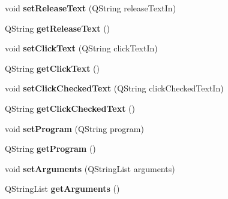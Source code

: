 \begin{DoxyCompactItemize}
\item 
\hypertarget{classQEGenericButton_a64a200354d9204778b75afdfb0e85f84}{
void {\bfseries setReleaseText} (QString releaseTextIn)}
\label{classQEGenericButton_a64a200354d9204778b75afdfb0e85f84}

\item 
\hypertarget{classQEGenericButton_a6322b1cb4ab8b8e7b0b404aeffbc669f}{
QString {\bfseries getReleaseText} ()}
\label{classQEGenericButton_a6322b1cb4ab8b8e7b0b404aeffbc669f}

\item 
\hypertarget{classQEGenericButton_a35ed4c2409d7af10d3d0ae9dd0ab9ae9}{
void {\bfseries setClickText} (QString clickTextIn)}
\label{classQEGenericButton_a35ed4c2409d7af10d3d0ae9dd0ab9ae9}

\item 
\hypertarget{classQEGenericButton_adc9c5638248c2ec7759a8feb5295e7c4}{
QString {\bfseries getClickText} ()}
\label{classQEGenericButton_adc9c5638248c2ec7759a8feb5295e7c4}

\item 
\hypertarget{classQEGenericButton_affa8b16866dce13bd1726ef093155611}{
void {\bfseries setClickCheckedText} (QString clickCheckedTextIn)}
\label{classQEGenericButton_affa8b16866dce13bd1726ef093155611}

\item 
\hypertarget{classQEGenericButton_a6560ee24d0327dc30d01a6d5a7bd01fb}{
QString {\bfseries getClickCheckedText} ()}
\label{classQEGenericButton_a6560ee24d0327dc30d01a6d5a7bd01fb}

\item 
\hypertarget{classQEGenericButton_a276bcc01c487455167e8e05242b4d306}{
void {\bfseries setProgram} (QString program)}
\label{classQEGenericButton_a276bcc01c487455167e8e05242b4d306}

\item 
\hypertarget{classQEGenericButton_a3296f8deab9ca68a5092815e35b1d52d}{
QString {\bfseries getProgram} ()}
\label{classQEGenericButton_a3296f8deab9ca68a5092815e35b1d52d}

\item 
\hypertarget{classQEGenericButton_a0d92db106dde516d6828fb58c9dd37e8}{
void {\bfseries setArguments} (QStringList arguments)}
\label{classQEGenericButton_a0d92db106dde516d6828fb58c9dd37e8}

\item 
\hypertarget{classQEGenericButton_af8bac549a10c0dd8ee9b9d90b4030c18}{
QStringList {\bfseries getArguments} ()}
\label{classQEGenericButton_af8bac549a10c0dd8ee9b9d90b4030c18}


\end{DoxyCompactItemize}
